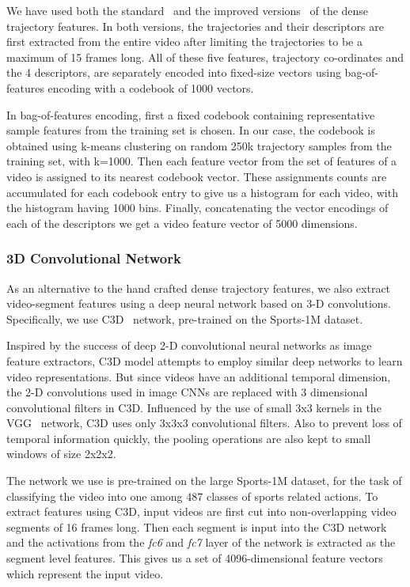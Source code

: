 We have used both the standard~\cite{DBLP:conf/cvpr/WangKSL11} and the improved
versions~\cite{Wang2013} of the dense trajectory features.
In both versions, the trajectories and their descriptors are first extracted
from the entire video after limiting the trajectories to be a maximum of 15
frames long.
All of these five features, trajectory co-ordinates and the 4 descriptors, are
separately encoded into fixed-size vectors using bag-of-features encoding with a
codebook of 1000 vectors.

In bag-of-features encoding, first a fixed codebook containing representative
sample features from the training set is chosen.
In our case, the codebook is obtained using k-means clustering on random 250k
trajectory samples from the training set, with k=1000.
Then each feature vector from the set of features of a video is assigned to its
nearest codebook vector.
These assignments counts are accumulated for each codebook entry to give us a
histogram for each video, with the histogram having 1000 bins.
Finally, concatenating the vector encodings of each of the descriptors we get a
video feature vector of 5000 dimensions. 

\subsubsection{3D Convolutional Network}
As an alternative to the hand crafted dense trajectory features, we also extract
video-segment features using a deep neural network based on 3-D
convolutions. 
Specifically, we use C3D~\cite{DBLP:C3D} network, pre-trained on the Sports-1M
dataset.

Inspired by the success of deep 2-D convolutional neural networks as image
feature extractors, C3D model attempts to employ similar deep networks to learn
video representations.
But since videos have an additional temporal dimension, the 2-D convolutions
used in image CNNs are replaced with 3 dimensional convolutional filters in C3D.
Influenced by the use of small 3x3 kernels in the VGG~\cite{Simonyan14c}
network, C3D uses only 3x3x3 convolutional filters.
Also to prevent loss of temporal information quickly, the pooling operations are
also kept to small windows of size 2x2x2.

The network we use is pre-trained on the large Sports-1M dataset, for the task
of classifying the video into one among 487 classes of sports related actions.
To extract features using C3D, input videos are first cut into non-overlapping
video segments of 16 frames long.
Then each segment is input into the C3D network and the activations from the
\emph{fc6} and \emph{fc7} layer of the network is extracted as the segment level
features.
This gives us a set of 4096-dimensional feature vectors which represent the
input video.


